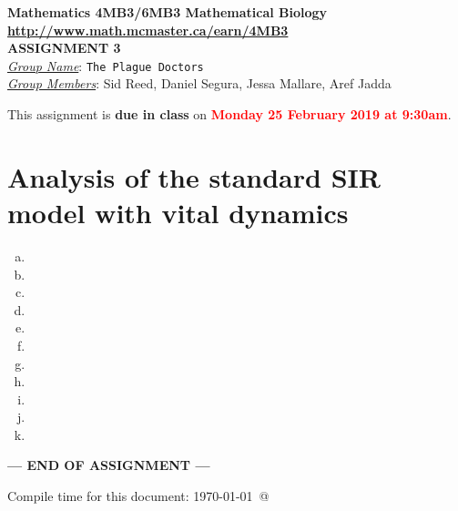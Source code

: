\documentclass[12pt]{article}\usepackage[]{graphicx}\usepackage[]{color}
\begin{document}
\begin{center}
{\bf Mathematics 4MB3/6MB3 Mathematical Biology\\
\smallskip
\url{http://www.math.mcmaster.ca/earn/4MB3}\\
 ASSIGNMENT 3}\\
\medskip
\underline{\emph{Group Name}}: \texttt{{\color{blue}The Plague Doctors}}\\
\medskip
\underline{\emph{Group Members}}: {\color{blue}Sid Reed, Daniel Segura, Jessa Mallare, Aref Jadda}
\end{center}
\bigskip
\noindent
This assignment is {\bfseries\color{red} due in class} on \textcolor{red}{\bf Monday 25 February 2019 at 9:30am}.
\bigskip

\section*{Analysis of the standard SIR model with vital dynamics}
\SIRintro

\begin{enumerate}[(a)]
\item 
\item 
\item 
\item 
\item 
\item 
\item 
\item 
\item
\item
\item 
\end{enumerate}


\bigskip\vfill

\centerline{\bf--- END OF ASSIGNMENT ---}

\bigskip
Compile time for this document:
\today\ @ \thistime
\end{document}
